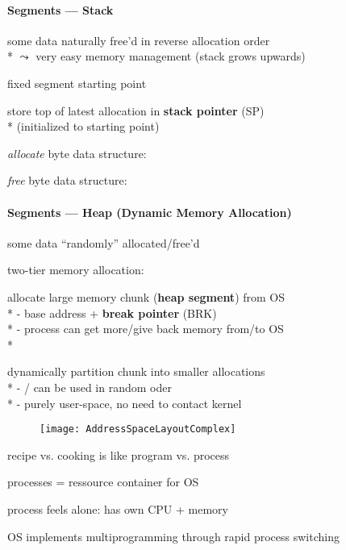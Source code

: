 \paragraph{Segments --- Stack}
\begin{items}
	\item some data naturally free'd in reverse allocation order \\*
		\( \leadsto \) very easy memory management (stack grows upwards)
	\item fixed segment starting point
	\item store top of latest allocation in \textbf{stack pointer} (SP) \\*
		(initialized to starting point)
	\item \emph{allocate}  byte data structure: 
	\item \emph{free}  byte data structure: 
\end{items}

\paragraph{Segments --- Heap (Dynamic Memory Allocation)}
\begin{items}
	\item some data "`randomly"' allocated/free'd
	\item two-tier memory allocation:
	\begin{enumeration}
		\item allocate large memory chunk (\textbf{heap segment}) from OS \\*
			- base address + \textbf{break pointer} (BRK) \\*
			- process can get more/give back memory from/to OS \\*
		\item dynamically partition chunk into smaller allocations \\*
			- / can be used in random oder \\*
			- purely user-space, no need to contact kernel
	\end{enumeration}
\end{items}

\begin{figure}[H]\centering\label{AddressSpaceLayoutComplex}\texttt{[image: AddressSpaceLayoutComplex]}\end{figure}

\begin{summary}
	\begin{items}
		\setlength\itemsep{0em}
		\item recipe vs. cooking is like program vs. process
		\item processes = ressource container for OS
		\item process feels alone: has own CPU + memory
		\item OS implements multiprogramming through rapid process switching
	\end{items}
\end{summary}